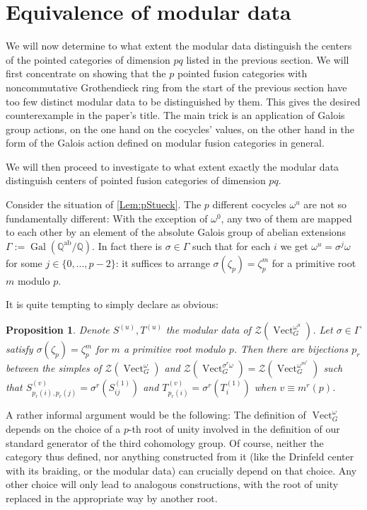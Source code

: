 \documentclass[12pt]{amsart}
\newtheorem{Prop}[Thm]{Proposition}
\theoremstyle{remark}
\theoremstyle{definition}
\numberwithin{equation}{section}
\newcommand\Vect{\operatorname{Vect}}
\newcommand\Q{\mathbb Q}
\newcommand\CTR{\mathcal Z}
\newcommand\Gal{\operatorname{Gal}}
\newcommand\ab{{\operatorname{ab}}}
\begin{document}
\section{Equivalence of modular data}
\label{sec:sameST}

We will now determine to what extent the modular data distinguish the centers of the pointed categories of dimension $pq$ listed in the previous section. We will first concentrate on showing that the $p$ pointed fusion categories with noncommutative Grothendieck ring from the start of the previous section have too few distinct modular data to be distinguished by them. This gives the desired counterexample in the paper's title. The main trick is an application of Galois group actions, on the one hand on the cocycles' values, on the other hand in the form of the Galois action defined on modular fusion categories in general.

We will then proceed to investigate to what extent exactly the modular data distinguish centers of pointed fusion categories of dimension $pq$.

Consider the situation of \cref{Lem:pStueck}.
The $p$ different cocycles $\omega^u$ are not so fundamentally different: With the exception of $\omega^0$, any two of them are mapped to each other by an element of the absolute Galois group of abelian extensions $\Gamma:=\Gal(\Q^\ab/\Q)$. In fact there is $\sigma\in\Gamma$ such that for each $i$ we get $\omega^u=\sigma^j\omega$ for some $j\in\{0,...,p-2\}$: it suffices to arrange $\sigma(\zeta_p)=\zeta_p^m$ for a primitive root $m$ modulo $p$. 

It is quite tempting to simply declare as obvious:
\begin{Prop}
  Denote $S^{(u)},T^{(u)}$ the modular data of $\CTR(\Vect_G^{\omega^u})$. Let $\sigma\in\Gamma$ satisfy $\sigma(\zeta_p)=\zeta_p^m$ for $m$ a primitive root modulo $p$. Then there are bijections $p_r$ between the simples of $\CTR(\Vect_G^{\omega})$ and $\CTR(\Vect_G^{\sigma^r\omega})=\CTR(\Vect_G^{\omega^{m^r}})$ such that $S_{p_r(i),p_r(j)}^{(v)}=\sigma^r(S_{ij}^{(1)})$ and $T_{p_r(i)}^{(v)}=\sigma^r(T_{i}^{(1)})$ when $v\equiv m^r(p)$.
\end{Prop}
A rather informal argument would be the following: The definition of $\Vect_G^\omega$ depends on the choice of a $p$-th root of unity involved in the definition of our standard generator of the third cohomology group. Of course, neither the category thus defined, nor anything constructed from it (like the Drinfeld center with its braiding, or the modular data) can crucially depend on that choice. Any other choice will only lead to analogous constructions, with the root of unity replaced in the appropriate way by another root.
\end{document}
